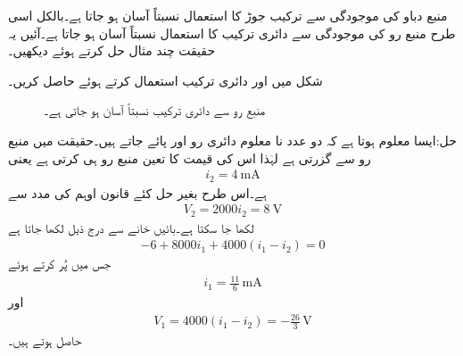 منبع دباو کی موجودگی سے ترکیب جوڑ کا استعمال نسبتاً آسان ہو جاتا ہے۔بالکل اسی طرح منبع رو کی موجودگی سے دائری ترکیب کا استعمال نسبتاً آسان ہو جاتا ہے۔آئیں یہ حقیقت چند مثال حل کرتے ہوئے دیکھیں۔

شکل  میں  اور  دائری ترکیب استعمال کرتے ہوئے حاصل کریں۔

\begin{figure}
\centering
{}
\caption{منبع رو سے دائری ترکیب نسبتاً آسان ہو جاتی ہے۔}
\label{شکل_جوڑ_منبع_رو_آسان_ترکیب_دائری_الف}
\end{figure}

حل:ایسا معلوم ہوتا ہے کہ دو عدد نا معلوم دائری رو  اور  پائے جاتے ہیں۔حقیقت میں  منبع رو سے گزرتی ہے لہٰذا اس کی قیمت کا تعین منبع رو ہی کرتی ہے یعنی
\begin{align*}
i_2=\SI{4}{\milli\ampere}
\end{align*}
ہے۔اس طرح بغیر حل کئے قانون اوہم کی مدد سے
\begin{align*}
V_2=2000 i_2=\SI{8}{\volt} 
\end{align*}
لکھا جا سکتا ہے۔بائیں خانے سے درج ذیل لکھا جاتا ہے
\begin{align*}
-6+8000i_1 +4000(i_1-i_2)=0
\end{align*}
جس میں  پُر کرتے ہوئے
\begin{align*}
i_1=\frac{11}{6} \, \si{\milli\ampere}
\end{align*}
اور
\begin{align*}
V_1=4000(i_1-i_2)=-\frac{26}{3} \,\si{\volt}
\end{align*}
حاصل ہوتے ہیں۔


